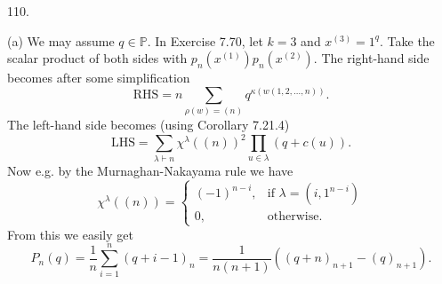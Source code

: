 110.

(a) We may assume $q\in\mathbb{P}$. In Exercise 7.70, let $k=3$ and $x^{(3)}=1^{q}$. Take the scalar product of both sides with $p_n\left(x^{(1)}\right)p_n\left(x^{(2)}\right)$. The right-hand side becomes after some simplification
\[
\mathrm{RHS}=n\sum_{\rho(w)=(n)}q^{\kappa(w(1,2,\ldots,n))}.
\]
The left-hand side becomes (using Corollary 7.21.4)
\[
\mathrm{LHS}=\sum_{\lambda\vdash n}\chi^{\lambda}((n))^2\prod_{u\in\lambda}(q+c(u)).
\]
Now e.g. by the Murnaghan-Nakayama rule we have
\[
\chi^{\lambda}((n))=\begin{cases}(-1)^{n-i}, & \text{if } \lambda=(i,1^{n-i})\\ 0, & \text{otherwise.}\end{cases}
\]
From this we easily get
\[
P_n(q)=\frac{1}{n}\sum_{i=1}^{n}(q+i-1)_n=\frac{1}{n(n+1)}\left((q+n)_{n+1}-(q)_{n+1}\right).
\]
